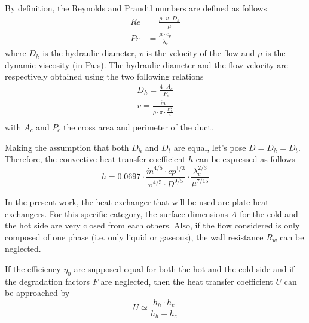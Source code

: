 By definition, the Reynolds and Prandtl numbers are defined as follows
\begin{align}
Re &= \frac{\rho\cdot v\cdot D_h}{\mu}\label{eq:C3_Re}\\
Pr &= \frac{\mu\cdot c_p}{\lambda_c}\label{eq:C3_Pr}
\end{align}
where $D_h$ is the hydraulic diameter, $v$ is the velocity of the flow and $\mu$ is the dynamic viscosity (in Pa$\cdot$s). The hydraulic diameter and the flow velocity are respectively obtained using the two following relations
\begin{align}
D_h = \frac{4\cdot A_c}{P_c}\label{eq:C3_Dh}\\
v=\frac{\dot{m}}{\rho\cdot\pi\cdot\frac{D_h^2}{4}}\label{eq:C3_v}\\
\end{align}
with $A_c$ and $P_c$ the cross area and perimeter of the duct\citep{Ngendakumana2018}.

Making the assumption that both $D_h$ and $D_t$ are equal, let's pose $D=D_h=D_t$. Therefore, the convective heat transfer coefficient $h$ can be expressed as follows
\begin{equation}
h = 0.0697\cdot \frac{\dot{m}^{4/5}\cdot cp^{1/3}}{\pi^{4/5}\cdot D^{9/5}}\cdot \frac{\lambda_c^{2/3}}{\mu^{7/15}}
\end{equation}

In the present work, the heat-exchanger that will be used are plate heat-exchangers. For this specific category, the surface dimensions $A$ for the cold and the hot side are very closed from each others. Also, if the flow considered is only composed of one phase (i.e. only liquid or gaseous), the wall resistance $R_w$ can be neglected. 

If the efficiency $\eta_0$ are supposed equal for both the hot and the cold side and if the degradation factors $F$ are neglected, then the heat transfer coefficient $U$ can be approached by
\begin{equation}
U \simeq \frac{h_h\cdot h_c}{h_h + h_c}\label{eq:C3_AU_prop}
\end{equation}
